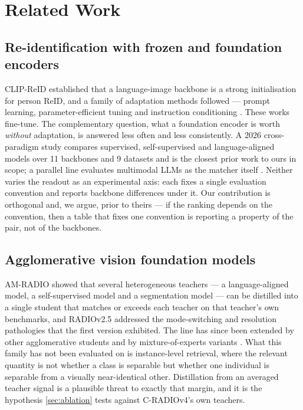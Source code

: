 \section{Related Work}\label{sec:related}

\subsection{Re-identification with frozen and foundation encoders}
CLIP-ReID \cite{li2023clipreid} established that a language-image backbone is a strong
initialisation for person ReID, and a family of adaptation methods followed --- prompt
learning, parameter-efficient tuning and instruction conditioning
\cite{he2024mambapro,chen2024instructreid,zhu2022pass}. These works fine-tune. The
complementary question, what a foundation encoder is worth \emph{without} adaptation, is
answered less often and less consistently. A 2026 cross-paradigm study
\cite{paradigm2026} compares supervised, self-supervised and language-aligned models over 11
backbones and 9 datasets and is the closest prior work to ours in scope; a parallel line
evaluates multimodal LLMs as the matcher itself \cite{mmreid2025}. Neither varies the readout
as an experimental axis: each fixes a single evaluation convention and reports backbone
differences under it. Our contribution is orthogonal and, we argue, prior to theirs --- if the
ranking depends on the convention, then a table that fixes one convention is reporting a
property of the pair, not of the backbones.

\subsection{Agglomerative vision foundation models}
AM-RADIO \cite{ranzinger2024amradio} showed that several heterogeneous teachers --- a
language-aligned model, a self-supervised model and a segmentation model --- can be distilled
into a single student that matches or exceeds each teacher on that teacher's own benchmarks,
and RADIOv2.5 \cite{heinrich2025radiov25} addressed the mode-switching and resolution
pathologies that the first version exhibited. The line has since been extended by other
agglomerative students \cite{eupe2026} and by mixture-of-experts variants
\cite{amoe2025}. What this family has not been evaluated on is instance-level retrieval, where
the relevant quantity is not whether a class is separable but whether one individual is
separable from a visually near-identical other. Distillation from an averaged teacher signal
is a plausible threat to exactly that margin, and it is the hypothesis \cref{sec:ablation}
tests against C-RADIOv4's own teachers.

